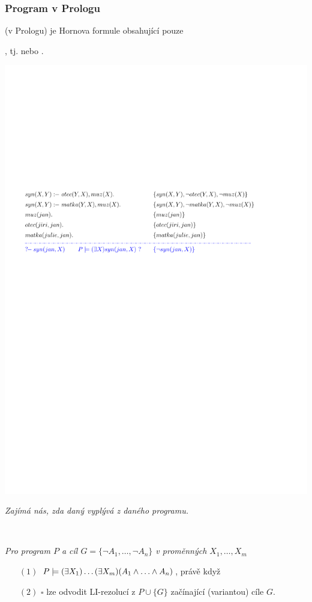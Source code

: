 \subsubsection*{Program v Prologu}
     (v Prologu) je Hornova formule obsahující pouze 
    \smallskip
    
    , tj.  nebo .
    \bigskip
    
    \centerline{\includegraphics[scale=0.7]{files/rezolucePLprogram}}
    \bigskip
    
    {\it Zajímá nás, zda daný  vyplývá z daného programu.}%
    \medskip
    
    {\bf {}}\ \ {\it Pro program $P$ a cíl $G=\{\neg A_1, \dots, \neg A_n\}$ v proměnných $X_1,\dots,X_m$
    
    \vspace{-0mm}
    \begin{enumerate}
    \item[$(1)$] $P \models (\exists X_1)\dots(\exists X_m)(A_1\mand \dots \mand A_n)$, právě když
    \smallskip
    
    \item[$(2)$] $\square$ lze odvodit LI-rezolucí z $P\cup\{G\}$ začínající (variantou) cíle $G$.
    \end{enumerate}}
    
